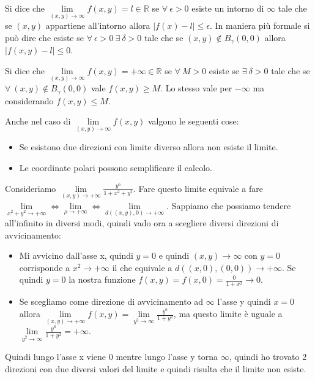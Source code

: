 \begin{definition}
Si dice che $\lim\limits_{(x,y)\to \infty}f(x,y) = l \in \mathbb{R}$ se $\forall \: \epsilon > 0$ esiste un intorno di $\infty$ tale che se $(x,y)$ appartiene all'intorno allora $|f(x) - l|\leq \epsilon$. In maniera più formale si può dire che esiste se $\forall \: \epsilon > 0 \:\exists\: \delta > 0$ tale che se $(x,y) \notin B_{\gamma}(0,0)$ allora $|f(x,y) - l| \leq 0$.
\end{definition}

\begin{definition}
Si dice che $\lim\limits_{(x,y)\to \infty}f(x,y) = +\infty \in \mathbb{R}$ se $\forall \: M > 0$ esiste se $\exists\: \delta > 0$ tale che se $\forall \: (x,y) \notin B_{\gamma}(0,0)$ vale $f(x,y) \geq M$. Lo stesso vale per $-\infty$ ma considerando $f(x,y) \leq M$.
\end{definition}
\hspace{-15pt}Anche nel caso di $\lim\limits_{(x,y)\to \infty}f(x,y)$ valgono le seguenti cose:
\begin{itemize}
    \item Se esistono due direzioni con limite diverso allora non esiste il limite.
    \item Le coordinate polari possono semplificare il calcolo.
\end{itemize}

\begin{example}
Consideriamo $\lim\limits_{(x,y)\to +\infty}\frac{y^6}{1 + x^2 + y^2}$. Fare questo limite equivale a fare $\lim\limits_{x^2 + y^2\to +\infty} \Longleftrightarrow \lim\limits_{\rho\to +\infty} \Longleftrightarrow \lim\limits_{d((x,y),0)\to +\infty}$. Sappiamo che possiamo tendere all'infinito in diversi modi, quindi vado ora a scegliere diversi direzioni di avvicinamento:
\begin{itemize}
    \item Mi avvicino dall'asse x, quindi $y=0$ e quindi $(x,y)\to \infty$ con $y=0$ corrisponde a $x^2 \to +\infty$ il che equivale a $d((x,0),(0,0))\to +\infty$. Se quindi $y=0$ la nostra funzione $f(x,y) = f(x,0) = \frac{0}{1+x^2} \to 0$.
    \item Se scegliamo come direzione di avvicinamento ad $\infty$ l'asse y quindi $x=0$ allora $\lim\limits_{(x,y)\to +\infty}f(x,y) = \lim\limits_{y^2 \to \infty}\frac{y^6}{1 + y^2}$, ma questo limite è uguale a $\lim\limits_{y^2 \to \infty}\frac{y^6}{1 + y^2} = +\infty$.
\end{itemize}
Quindi lungo l'asse x viene 0 mentre lungo l'asse y torna $\infty$, quindi ho trovato 2 direzioni con due diversi valori del limite e quindi risulta che il limite non esiste.
\end{example}

